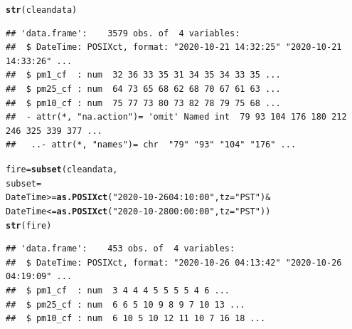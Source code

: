 \documentclass{article}\usepackage[]{graphicx}\usepackage[]{color}
\makeatletter
\newcommand{\hlstr}[1]{\textcolor[rgb]{0.192,0.494,0.8}{#1}}%
\newcommand{\hlopt}[1]{\textcolor[rgb]{0,0,0}{#1}}%
\newcommand{\hlstd}[1]{\textcolor[rgb]{0.345,0.345,0.345}{#1}}%
\newcommand{\hlkwb}[1]{\textcolor[rgb]{0.69,0.353,0.396}{#1}}%
\newcommand{\hlkwc}[1]{\textcolor[rgb]{0.333,0.667,0.333}{#1}}%
\newcommand{\hlkwd}[1]{\textcolor[rgb]{0.737,0.353,0.396}{\textbf{#1}}}%
\newenvironment{kframe}{%
 \def\at@end@of@kframe{}%
 \ifinner\ifhmode%
  \def\at@end@of@kframe{\end{minipage}}%
  \begin{minipage}{\columnwidth}%
 \fi\fi%
 \def\FrameCommand##1{\hskip\@totalleftmargin \hskip-\fboxsep
 \colorbox{shadecolor}{##1}\hskip-\fboxsep
     \hskip-\linewidth \hskip-\@totalleftmargin \hskip\columnwidth}%
 \MakeFramed {\advance\hsize-\width
   \@totalleftmargin\z@ \linewidth\hsize
   \@setminipage}}%
 {\par\unskip\endMakeFramed%
 \at@end@of@kframe}
\newenvironment{knitrout}{}{} %
\makeatother
\begin{document}
\begin{knitrout}
\color{fgcolor}\begin{kframe}
\begin{alltt}
\hlkwd{str}\hlstd{(cleandata)}
\end{alltt}
\begin{verbatim}
## 'data.frame':	3579 obs. of  4 variables:
##  $ DateTime: POSIXct, format: "2020-10-21 14:32:25" "2020-10-21 14:33:26" ...
##  $ pm1_cf  : num  32 36 33 35 31 34 35 34 33 35 ...
##  $ pm25_cf : num  64 73 65 68 62 68 70 67 61 63 ...
##  $ pm10_cf : num  75 77 73 80 73 82 78 79 75 68 ...
##  - attr(*, "na.action")= 'omit' Named int  79 93 104 176 180 212 246 325 339 377 ...
##   ..- attr(*, "names")= chr  "79" "93" "104" "176" ...
\end{verbatim}
\begin{alltt}
\hlstd{fire} \hlkwb{=} \hlkwd{subset}\hlstd{(cleandata,}
  \hlkwc{subset}\hlstd{=}
    \hlstd{DateTime} \hlopt{>=} \hlkwd{as.POSIXct}\hlstd{(}\hlstr{"2020-10-26 04:10:00"}\hlstd{,} \hlkwc{tz}\hlstd{=}\hlstr{"PST"}\hlstd{)} \hlopt{&}
    \hlstd{DateTime} \hlopt{<=} \hlkwd{as.POSIXct}\hlstd{(}\hlstr{"2020-10-28 00:00:00"}\hlstd{,} \hlkwc{tz}\hlstd{=}\hlstr{"PST"}\hlstd{))}
\hlkwd{str}\hlstd{(fire)}
\end{alltt}
\begin{verbatim}
## 'data.frame':	453 obs. of  4 variables:
##  $ DateTime: POSIXct, format: "2020-10-26 04:13:42" "2020-10-26 04:19:09" ...
##  $ pm1_cf  : num  3 4 4 4 5 5 5 5 4 6 ...
##  $ pm25_cf : num  6 6 5 10 9 8 9 7 10 13 ...
##  $ pm10_cf : num  6 10 5 10 12 11 10 7 16 18 ...
\end{verbatim}
\end{kframe}
\end{knitrout}
\end{document}
